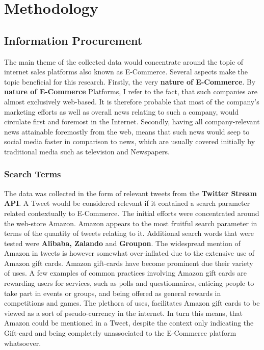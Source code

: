 \section{Methodology}
	\subsection{Information Procurement}
	The main theme of the collected data would concentrate around the topic of internet sales platforms also known as E-Commerce. Several aspects make the topic beneficial for this research. Firstly, the very {\bfseries nature of E-Commerce}. By {\bfseries nature of E-Commerce} Platforms, I refer to the fact, that such companies are almost exclusively web-based. It is therefore probable that most of the company's marketing efforts as well as overall news relating to such a company, would circulate first and foremost in the Internet. Secondly, having all company-relevant news attainable foremostly from the web, means that such news would seep to social media faster in comparison to news, which are usually covered initially by traditional media such as television and Newspapers. 
	
		\subsubsection*{Search Terms}
		The data was collected in the form of relevant tweets from the {\bfseries Twitter Stream API}. A Tweet would be considered relevant if it contained a search parameter related contextually to E-Commerce. The initial efforts were concentrated around the web-store Amazon. Amazon appears to the most fruitful search parameter in terms of the quantity of tweets relating to it. Additional search words that were tested were {\bfseries Alibaba, Zalando} and {\bfseries Groupon}. 
		The widespread mention of Amazon in tweets is however somewhat over-inflated due to the extensive use of Amazon gift cards. Amazon gift-cards have become prominent due their variety of uses. A few examples of common practices involving Amazon gift cards are rewarding users for services, such as polls and questionnaires, enticing people to take part in events or groups, and being offered as general rewards in competitions and games. The plethora of uses, facilitates Amazon gift cards to be viewed as a sort of pseudo-currency in the internet. In turn this means, that Amazon could be mentioned in a Tweet, despite the context only indicating the Gift-card and being completely unassociated to the E-Commerce platform whatsoever.
		
